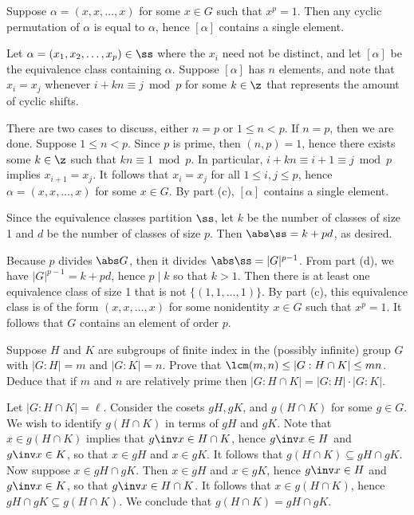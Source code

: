 \begin{problems}
\begin{solalph}
        \noindent \leftimp Suppose $\alpha = (x, x, \dots, x)$ for some $x \in G$ such that $x^p = 1$. Then any cyclic permutation of $\alpha$ is equal to $\alpha$, hence $[\alpha]$ contains a single element.
        \item Let $\alpha = (x_1, x_2, \dots, x_p) \in \ss$ where the $x_i$ need not be distinct, and let $[\alpha]$ be the equivalence class containing $\alpha$. Suppose $[\alpha]$ has $n$ elements, and note that $x_i = x_j$ whenever $i + kn \equiv j \bmod p$ for some $k \in \z$ that represents the amount of cyclic shifts.
        
        There are two cases to discuss, either $n = p$ or $1 \leq n < p$. If $n = p$, then we are done. Suppose $1 \leq n < p$. Since $p$ is prime, then $(n, p) = 1$, hence there exists some $k \in \z$ such that $kn \equiv 1 \bmod p$. In particular, $i + kn \equiv i + 1 \equiv j \bmod p$ implies $x_{i + 1} = x_j$. It follows that $x_i = x_j$ for all $1 \leq i, j \leq p$, hence $\alpha = (x, x, \dots, x)$ for some $x \in G$. By part (c), $[\alpha]$ contains a single element.

        Since the equivalence classes partition $\ss$, let $k$ be the number of classes of size 1 and $d$ be the number of classes of size $p$. Then $\abs\ss = k + pd$, as desired.
        \item Because $p$ divides $\abs G$, then it divides $\abs\ss = |G|^{p-1}$. From part (d), we have $|G|^{p-1} = k + pd$, hence $p \mid k$ so that $k > 1$. Then there is at least one equivalence class of size 1 that is not $\{(1, 1, \dots, 1)\}$. By part (c), this equivalence class is of the form $(x, x, \dots, x)$ for some nonidentity $x \in G$ such that $x^p = 1$. It follows that $G$ contains an element of order $p$.
    \end{solalph}
    \item \label{ex3.2.10} Suppose $H$ and $K$ are subgroups of finite index in the (possibly infinite) group $G$ with $|G : H| = m$ and $|G : K| = n$. Prove that $\lcm(m, n) \leq |G : H \cap K| \leq mn$. Deduce that if $m$ and $n$ are relatively prime then $|G : H \cap K| = |G : H| \cdot |G : K|$.
    \begin{sol} 
        Let $|G : H \cap K| = \ell$. Consider the cosets $gH, gK$, and $g(H \cap K)$ for some $g \in G$. We wish to identify $g(H \cap K)$ in terms of $gH$ and $gK$. Note that $x \in g(H \cap K)$ implies that $g\inv x \in H \cap K$, hence $g\inv x \in H$ and $g\inv x \in K$, so that $x \in gH$ and $x \in gK$. It follows that $g(H \cap K) \subseteq gH \cap gK$. Now suppose $x \in gH \cap gK$. Then $x \in gH$ and $x \in gK$, hence $g\inv x \in H$ and $g\inv x \in K$, so that $g\inv x \in H \cap K$. It follows that $x \in g(H \cap K)$, hence $gH \cap gK \subseteq g(H \cap K)$. We conclude that $g(H \cap K) = gH \cap gK$.


\end{sol}
\end{problems}
